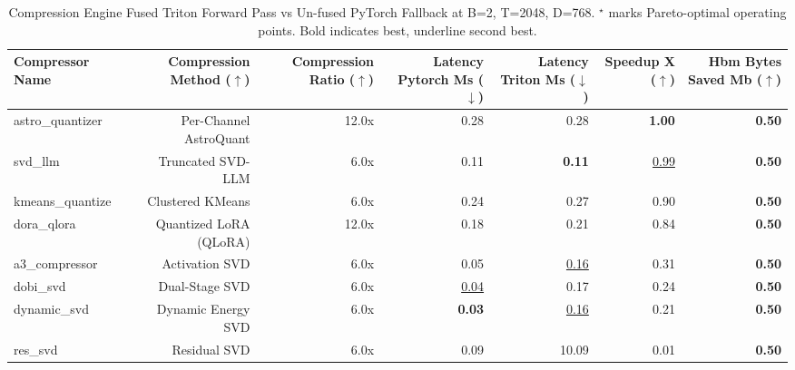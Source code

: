 \begin{table}[t]
\centering
\small
\setlength{\tabcolsep}{5pt}
\begin{tabular}{lrrrrrr}
\toprule
Compressor Name & Compression Method ($\uparrow$) & Compression Ratio ($\uparrow$) & Latency Pytorch Ms ($\downarrow$) & Latency Triton Ms ($\downarrow$) & Speedup X ($\uparrow$) & Hbm Bytes Saved Mb ($\uparrow$) \\
\midrule
astro\_quantizer & Per-Channel AstroQuant & 12.0x & 0.28 & 0.28 & \textbf{1.00} & \textbf{0.50} \\
svd\_llm & Truncated SVD-LLM & 6.0x & 0.11 & \textbf{0.11} & \underline{0.99} & \textbf{0.50} \\
kmeans\_quantize & Clustered KMeans & 6.0x & 0.24 & 0.27 & 0.90 & \textbf{0.50} \\
dora\_qlora & Quantized LoRA (QLoRA) & 12.0x & 0.18 & 0.21 & 0.84 & \textbf{0.50} \\
a3\_compressor & Activation SVD & 6.0x & 0.05 & \underline{0.16} & 0.31 & \textbf{0.50} \\
dobi\_svd & Dual-Stage SVD & 6.0x & \underline{0.04} & 0.17 & 0.24 & \textbf{0.50} \\
dynamic\_svd & Dynamic Energy SVD & 6.0x & \textbf{0.03} & \underline{0.16} & 0.21 & \textbf{0.50} \\
res\_svd & Residual SVD & 6.0x & 0.09 & 10.09 & 0.01 & \textbf{0.50} \\
\bottomrule
\end{tabular}
\caption{Compression Engine Fused Triton Forward Pass vs Un-fused PyTorch Fallback at B=2, T=2048, D=768. $^\star$ marks Pareto-optimal operating points. Bold indicates best, underline second best.}
\label{tab:compression_engine_leaderboard}
\end{table}
